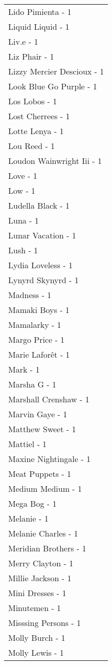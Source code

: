 \documentclass[
]{article}
\begin{document}
\begin{longtable}{l}
Lido Pimienta - 1 \\ 
Liquid Liquid - 1 \\ 
Liv.e - 1 \\ 
Liz Phair - 1 \\ 
Lizzy Mercier Descioux - 1 \\ 
Look Blue Go Purple - 1 \\ 
Los Lobos - 1 \\ 
Lost Cherrees - 1 \\ 
Lotte Lenya - 1 \\ 
Lou Reed - 1 \\ 
Loudon Wainwright Iii - 1 \\ 
Love - 1 \\ 
Low - 1 \\ 
Ludella Black - 1 \\ 
Luna - 1 \\ 
Lunar Vacation - 1 \\ 
Lush - 1 \\ 
Lydia Loveless - 1 \\ 
Lynyrd Skynyrd - 1 \\ 
Madness - 1 \\ 
Mamaki Boys - 1 \\ 
Mamalarky - 1 \\ 
Margo Price - 1 \\ 
Marie Laforêt - 1 \\ 
Mark - 1 \\ 
Marsha G - 1 \\ 
Marshall Crenshaw - 1 \\ 
Marvin Gaye - 1 \\ 
Matthew Sweet - 1 \\ 
Mattiel - 1 \\ 
Maxine Nightingale - 1 \\ 
Meat Puppets - 1 \\ 
Medium Medium - 1 \\ 
Mega Bog - 1 \\ 
Melanie - 1 \\ 
Melanie Charles - 1 \\ 
Meridian Brothers - 1 \\ 
Merry Clayton - 1 \\ 
Millie Jackson - 1 \\ 
Mini Dresses - 1 \\ 
Minutemen - 1 \\ 
Misssing Persons - 1 \\ 
Molly Burch - 1 \\ 
Molly Lewis - 1 \\ 

\end{longtable}
\end{document}
